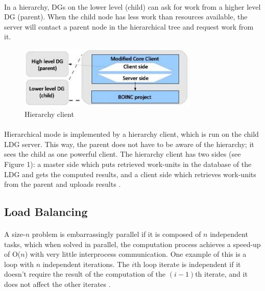 \documentclass[10pt, twocolumn, letterpaper]{article}
\begin{document}
\paragraph{}
In a hierarchy, DGs on the lower level (child) can ask for work from a higher level DG (parent). When the child node has less work than resources available, the server will contact a parent node in the hierarchical tree and request work from it.

\begin{figure}[h]
\begin{center}  
  \includegraphics[height=30mm]{SZTAKI_LDG.jpg}
  \caption{Hierarchy client \cite{balaton}}
\end{center}
\end{figure}

\paragraph{}
Hierarchical mode is implemented by a hierarchy client, which is run on the child LDG server. This way, the parent does not have to be aware of the hierarchy; it sees the child as one powerful client. The hierarchy client has two sides (see Figure 1): a master side which puts retrieved work-units in the database of the LDG and gets the computed results, and a client side which retrieves work-units from the parent and uploads results \cite{balaton}.

\subsection{Load Balancing}

\paragraph{}
A size-$n$ problem is embarrassingly parallel if it is composed of $n$ independent tasks, which when solved in parallel, the computation process achieves a speed-up of O($n$) with very little interprocess communication. One example of this is a loop with $n$ independent iterations. The $i$th loop iterate is independent if it doesn't require the result of the computation of the $(i-1)$th iterate, and it does not affect the other iterates \cite{pabico}.
\end{document}
